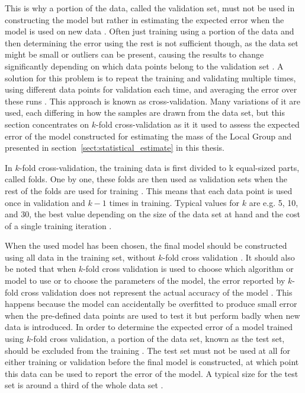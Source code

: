 \documentclass[english, oneside]{HYgradu}
\begin{document}
This is why a portion of the data, called the validation set, must not be used in constructing the model but rather in estimating the expected error when the model is used on new data \citep{alpaydin2014introduction}. Often just training using a portion of the data and then determining the error using the rest is not sufficient though, as the data set might be small or outliers can be present, causing the results to change significantly depending on which data points belong to the validation set \citep{alpaydin2014introduction}. A solution for this problem is to repeat the training and validating multiple times, using different data points for validation each time, and averaging the error over these runs \citep{alpaydin2014introduction}. This approach is known as cross-validation. Many variations of it are used, each differing in how the samples are drawn from the data set, but this section concentrates on $k$-fold cross-validation as it it used to assess the expected error of the model constructed for estimating the mass of the Local Group and presented in section~\ref{sect:statistical_estimate} in this thesis.

In $k$-fold cross-validation, the training data is first divided to k equal-sized parts, called folds. One by one, these folds are then used as validation sets when the rest of the folds are used for training \citep{alpaydin2014introduction, murphy2012machine}. This means that each data point is used once in validation and $k-1$ times in training. Typical values for $k$ are e.g. 5, 10, and 30, the best value depending on the size of the data set at hand and the cost of a single training iteration \citep{alpaydin2014introduction, murphy2012machine}.

When the used model has been chosen, the final model should be constructed using all data in the training set, without $k$-fold cross validation \citep{alpaydin2014introduction}. It should also be noted that when $k$-fold cross validation is used to choose which algorithm or model to use or to choose the parameters of the model, the error reported by $k$-fold cross validation does not represent the actual accuracy of the model \citep{alpaydin2014introduction}. This happens because the model can accidentally be overfitted to produce small error when the pre-defined data points are used to test it but perform badly when new data is introduced. In order to determine the expected error of a model trained using $k$-fold cross validation, a portion of the data set, known as the test set, should be excluded from the training \citep{alpaydin2014introduction}. The test set must not be used at all for either training or validation before the final model is constructed, at which point this data can be used to report the error of the model. A typical size for the test set is around a third of the whole data set \citep{alpaydin2014introduction}.
\end{document}
